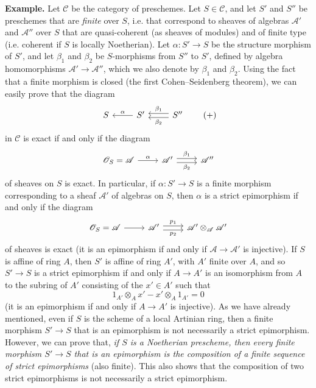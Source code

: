 \documentclass{article}
\newenvironment{rmenv}[1]
  {\phantomsection\par\medskip\noindent\textbf{#1.}\rmfamily}
  {\par\medskip}
\newcommand{\scr}[1]{{\mathscr{#1}}}
\renewcommand{\cal}[1]{{\mathcal{#1}}}
\newcommand{\oldpage}[1]{\marginpar{\footnotesize$\Big\vert$ \textit{p.~#1}}}
\begin{document}
\begin{rmenv}{Example}
  Let $\cal{C}$ be the category of preschemes.
  Let $S\in\cal{C}$, and let $S'$ and $S''$ be preschemes that are \emph{finite} over $S$, i.e. that correspond to sheaves of algebras $\scr{A}'$ and $\scr{A}''$ over $S$ that are quasi-coherent (as sheaves of modules) and of finite type (i.e. coherent if $S$ is locally Noetherian).
  Let $\alpha\colon S'\to S$ be the structure morphism of $S'$, and let $\beta_1$ and $\beta_2$ be $S$-morphisms from $S''$ to $S'$, defined by algebra homomorphisms $\scr{A}'\to\scr{A}''$, which we also denote by $\beta_1$ and $\beta_2$.
  Using the fact that a finite morphism is closed (the first Cohen--Seidenberg theorem), we can easily prove that the diagram
  \[
  \label{equation-example:A.2.b}
    \begin{tikzcd}
      S
      & S' \lar[swap,"\alpha"]
      & S'' \lar[shift left=1,"\beta_2"] \lar[shift right=1,swap,"\beta_1"]
    \end{tikzcd}
  \tag{+}
  \]
  in $\cal{C}$ is exact if and only if the diagram
\oldpage{190-08}
  \[
    \begin{tikzcd}
      \scr{O}_S = \scr{A} \rar["\alpha"]
      & \scr{A}' \rar[shift left=1,"\beta_1"] \rar[shift right=1,swap,"\beta_2"]
      & \scr{A}''
    \end{tikzcd}
  \]
  of sheaves on $S$ is exact.
  In particular, if $\alpha\colon S'\to S$ is a finite morphism corresponding to a sheaf $\scr{A}'$ of algebras on $S$, then $\alpha$ is a strict epimorphism if and only if the diagram
  \[
    \begin{tikzcd}
      \scr{O}_S = \scr{A} \rar
      & \scr{A}' \rar[shift left=1,"p_1"] \rar[shift right=1,swap,"p_2"]
      & \scr{A}'\otimes_{\scr{A}}\scr{A}'
    \end{tikzcd}
  \]
  of sheaves is exact (it is an epimorphism if and only if $\scr{A}\to\scr{A}'$ is injective).
  If $S$ is affine of ring $A$, then $S'$ is affine of ring $A'$, with $A'$ finite over $A$, and so $S'\to S$ is a strict epimorphism if and only if $A\to A'$ is an isomorphism from $A$ to the subring of $A'$ consisting of the $x'\in A'$ such that
  \[
    1_{A'}\otimes_A x' - x'\otimes_A 1_{A'} = 0
  \]
  (it is an epimorphism if and only if $A\to A'$ is injective).
  As we have already mentioned, even if $S$ is the scheme of a local Artinian ring, then a finite morphism $S'\to S$ that is an epimorphism is not necessarily a strict epimorphism.
  However, we can prove that, \emph{if $S$ is a Noetherian prescheme, then every finite morphism $S'\to S$ that is an epimorphism is the composition of a finite sequence of strict epimorphisms} (also finite).
  This also shows that the composition of two strict epimorphisms is not necessarily a strict epimorphism.
\end{rmenv}
\end{document}
